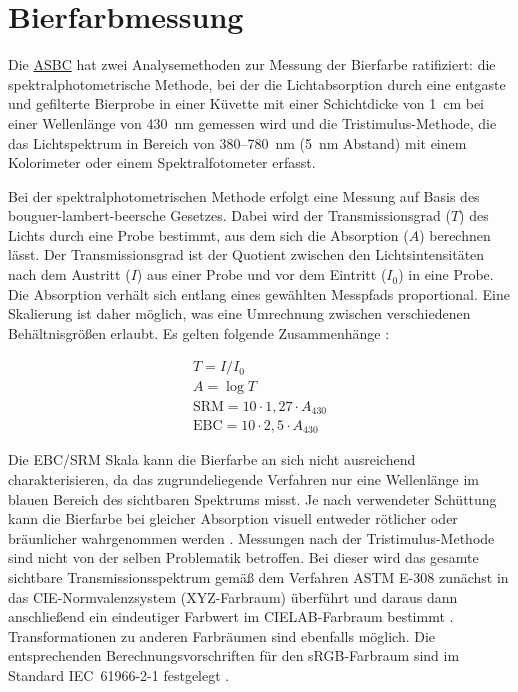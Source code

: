 \documentclass[10pt,a4paper,DIV=12,parskip=half]{scrarticle}
\begin{document}
\section*{Bierfarbmessung}

Die \href{https://www.asbcnet.org}{ASBC} hat zwei Analysemethoden zur Messung der Bierfarbe ratifiziert: die spektralphotometrische Methode, bei der die Lichtabsorption durch eine entgaste und gefilterte Bierprobe in einer Küvette mit einer Schichtdicke von 1~cm bei einer Wellenlänge von 430~nm gemessen wird und die Tristimulus-Methode, die das Lichtspektrum in Bereich von 380--780~nm (5~nm Abstand) mit einem Kolorimeter oder einem Spektralfotometer erfasst. \parencite{ASBC2011}

Bei der spektralphotometrischen Methode erfolgt eine Messung auf Basis des bouguer-lambert-beersche Gesetzes. Dabei wird der Transmissionsgrad ($T$) des Lichts durch eine Probe bestimmt, aus dem sich die Absorption ($A$) berechnen lässt. Der Transmissionsgrad ist der Quotient zwischen den Lichtsintensitäten nach dem Austritt ($I$) aus einer Probe und vor dem Eintritt ($I_0$) in eine Probe. Die Absorption verhält sich entlang eines gewählten Messpfads proportional. Eine Skalierung ist daher möglich, was eine Umrechnung zwischen verschiedenen Behältnisgrößen erlaubt. Es gelten folgende Zusammenhänge \parencite{deLange2016}:

\begin{equation*}
	\begin{gathered}
		T =  I / I_0 \\
		A = \log T \\		
		\textrm{SRM} = 10 \cdot 1,27 \cdot A_{430} \\		
		\textrm{EBC} = 10 \cdot 2,5 \cdot A_{430}
	\end{gathered}
\end{equation*}

Die EBC/SRM Skala kann die Bierfarbe an sich nicht ausreichend charakterisieren, da das zugrundeliegende Verfahren nur eine Wellenlänge im blauen Bereich des sichtbaren Spektrums misst. Je nach verwendeter Schüttung kann die Bierfarbe bei gleicher Absorption visuell entweder rötlicher oder bräunlicher wahrgenommen werden \parencite{Tucker2017}. Messungen nach der Tristimulus-Methode sind nicht von der selben Problematik betroffen. Bei dieser wird das gesamte sichtbare Transmissionsspektrum gemäß dem Verfahren ASTM E-308 zunächst in das CIE-Normvalenzsystem (XYZ-Farbraum) überführt und daraus dann anschließend ein eindeutiger Farbwert im CIELAB-Farbraum bestimmt \parencites{deLange2016}{ASBC2011}. Transformationen zu anderen Farbräumen sind ebenfalls möglich. Die entsprechenden Berechnungsvorschriften für den sRGB-Farbraum sind im Standard IEC~61966-2-1 festgelegt \parencite{W3C2015}.
\end{document}
